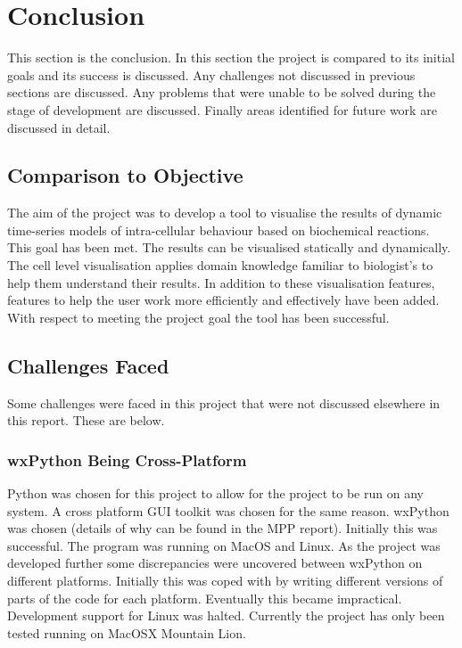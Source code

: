 \chapter{Conclusion}

This section is the conclusion.  In this section the project is compared to its initial goals and its success is discussed.  Any challenges not discussed in previous sections are discussed.  Any problems that were unable to be solved during the stage of development are discussed.  Finally areas identified for future work are discussed in detail.

\section{Comparison to Objective}

The aim of the project was to develop a tool to visualise the results of dynamic time-series models of intra-cellular behaviour based on biochemical reactions.  This goal has been met.  The results can be visualised statically and dynamically.  The cell level visualisation applies domain knowledge familiar to biologist's to help them understand their results.  In addition to these visualisation features, features to help the user work more efficiently and effectively have been added.  With respect to meeting the project goal the tool has been successful.


\section{Challenges Faced}

Some challenges were faced in this project that were not discussed elsewhere in this report.  These are below.

\subsection{wxPython Being Cross-Platform}
Python was chosen for this project to allow for the project to be run on any system.  A cross platform \ac{GUI} toolkit was chosen for the same reason.  wxPython was chosen (details of why can be found in the MPP report).  Initially this was successful.  The program was running on MacOS and Linux.  As the project was developed further some discrepancies were uncovered between wxPython on different platforms.  Initially this was coped with by writing different versions of parts of the code for each platform.  Eventually this became impractical.  Development support for Linux was halted.  Currently the project has only been tested running on MacOSX Mountain Lion.

